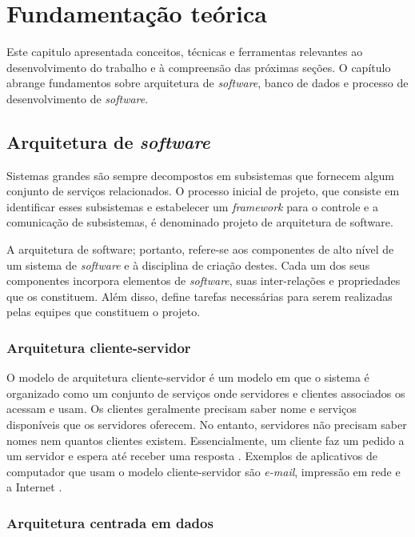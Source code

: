 \chapter{Fundamentação teórica}

Este capitulo apresentada conceitos, técnicas e ferramentas relevantes ao desenvolvimento
do trabalho e à compreensão das próximas seções. O capítulo abrange fundamentos sobre arquitetura de \textit{software}, banco de dados e processo de desenvolvimento de \textit{software}.

\section{Arquitetura de \textit{software}}
\label{fundArquietura}

Sistemas grandes são sempre decompostos em subsistemas que fornecem algum conjunto de serviços relacionados. O processo inicial de projeto, que consiste em identificar esses subsistemas e estabelecer um \textit{framework} para o controle e a comunicação de subsistemas, é denominado projeto de arquitetura de software. \cite{sommerville}

A arquitetura de software; portanto, refere-se aos componentes de alto nível de um sistema de \textit{software} e à disciplina de criação destes. Cada um dos seus componentes incorpora elementos de \textit{software}, suas inter-relações e propriedades que os constituem. Além disso, define tarefas necessárias para serem realizadas pelas equipes que constituem o projeto.


\subsection{Arquitetura cliente-servidor}
\label{arquiteturaClienteServidor}

O modelo de arquitetura cliente-servidor é um modelo em que o sistema é organizado como um conjunto de serviços onde servidores e clientes associados os acessam e usam. Os clientes geralmente precisam saber nome e serviços disponíveis que os servidores oferecem. No entanto, servidores não precisam saber nomes nem quantos clientes existem. Essencialmente, um cliente faz um pedido a um servidor e espera até receber uma resposta \cite{pressman}. Exemplos de aplicativos de computador que usam o modelo cliente-servidor são \textit{e-mail}, impressão em rede e a Internet \cite{kurose}.


\subsection{Arquitetura centrada em dados}
\label{arquiteturaCentralizadaDados}

